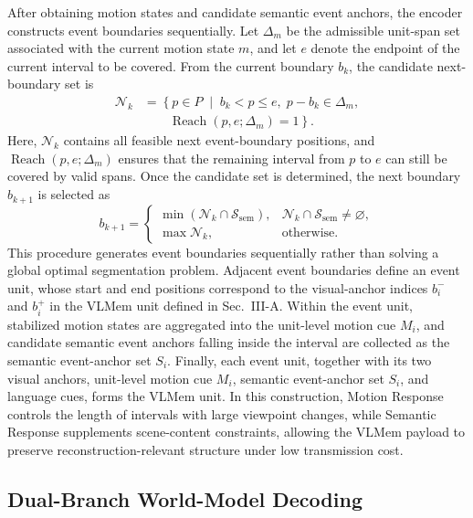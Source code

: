 \documentclass[journal]{IEEEtran}
\begin{document}
After obtaining motion states and candidate semantic event anchors, the encoder constructs event boundaries sequentially. Let \(\Delta_m\) be the admissible unit-span set associated with the current motion state \(m\), and let \(e\) denote the endpoint of the current interval to be covered. From the current boundary \(b_k\), the candidate next-boundary set is
\begin{equation}
\begin{aligned}
\mathcal{N}_k
&=
\left\{
p\in P
\;\middle|\;
b_k<p\le e,\;
p-b_k\in\Delta_m,\right.\\
&\qquad\left.
\operatorname{Reach}(p,e;\Delta_m)=1
\right\}.
\end{aligned}
\label{eq:candidate_boundary_set}
\end{equation}
Here, \(\mathcal{N}_k\) contains all feasible next event-boundary positions, and \(\operatorname{Reach}(p,e;\Delta_m)\) ensures that the remaining interval from \(p\) to \(e\) can still be covered by valid spans. Once the candidate set is determined, the next boundary \(b_{k+1}\) is selected as
\begin{equation}
b_{k+1}
=
\begin{cases}
\min\left(\mathcal{N}_k\cap\mathcal{S}_{\mathrm{sem}}\right),
& \mathcal{N}_k\cap\mathcal{S}_{\mathrm{sem}}\neq\varnothing,\\
\max \mathcal{N}_k,
& \text{otherwise}.
\end{cases}
\label{eq:admissible_boundary_construction}
\end{equation}
This procedure generates event boundaries sequentially rather than solving a global optimal segmentation problem. Adjacent event boundaries define an event unit, whose start and end positions correspond to the visual-anchor indices \(b_i^-\) and \(b_i^+\) in the VLMem unit defined in Sec.~III-A. Within the event unit, stabilized motion states are aggregated into the unit-level motion cue \(M_i\), and candidate semantic event anchors falling inside the interval are collected as the semantic event-anchor set \(S_i\). Finally, each event unit, together with its two visual anchors, unit-level motion cue \(M_i\), semantic event-anchor set \(S_i\), and language cues, forms the VLMem unit. In this construction, Motion Response controls the length of intervals with large viewpoint changes, while Semantic Response supplements scene-content constraints, allowing the VLMem payload to preserve reconstruction-relevant structure under low transmission cost.

\subsection{Dual-Branch World-Model Decoding}
\label{subsec:wm_lora_decoding}
\end{document}
